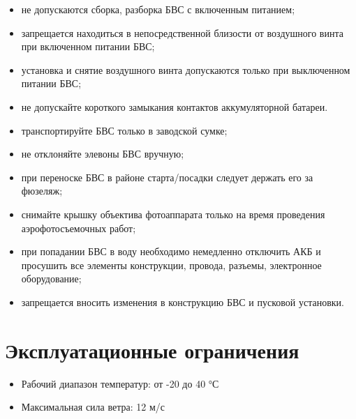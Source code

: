 \documentclass[a4paper,10pt,russian,openany]{sphinxmanual}
\begin{document}
\begin{itemize}
\item {} 
не допускаются сборка, разборка БВС с включенным питанием;

\item {} 
запрещается находиться в непосредственной близости от воздушного винта при включенном питании БВС;

\item {} 
установка и снятие воздушного винта допускаются только при выключенном питании БВС;

\item {} 
не допускайте короткого замыкания контактов аккумуляторной батареи.

\end{itemize}

\begin{itemize}
\item {} 
транспортируйте БВС только в заводской сумке;

\item {} 
не отклоняйте элевоны БВС вручную;

\item {} 
при переноске БВС в районе старта/посадки следует держать его за фюзеляж;

\item {} 
снимайте крышку объектива фотоаппарата только на время проведения аэрофотосъемочных работ;

\item {} 
при попадании БВС в воду необходимо немедленно отключить АКБ и просушить все элементы конструкции, провода, разъемы, электронное оборудование;

\item {} 
запрещается вносить изменения в конструкцию БВС и пусковой установки.

\end{itemize}


\section{Эксплуатационные ограничения}
\label{\detokenize{precautions:id2}}\begin{itemize}
\item {} 
Рабочий диапазон температур: от -20 до 40 °С

\item {} 
Максимальная сила ветра: 12 м/с

\end{itemize}
\end{document}
